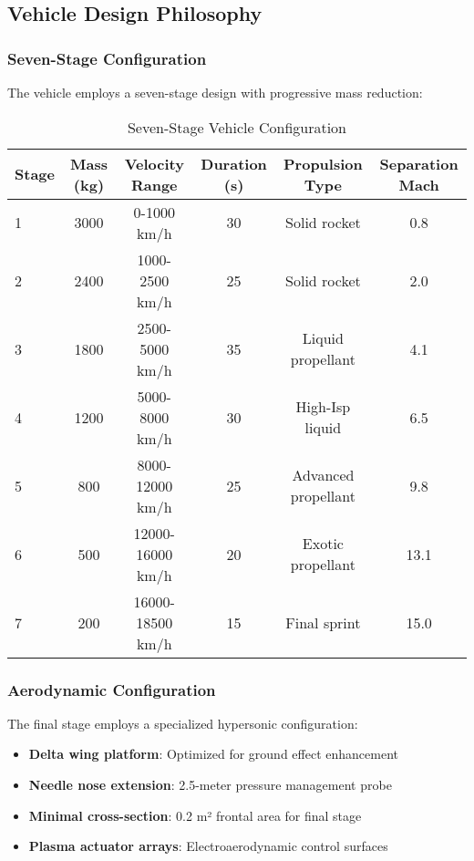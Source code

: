 \documentclass[12pt,a4paper]{article}
\begin{document}
\subsection{Vehicle Design Philosophy}

\subsubsection{Seven-Stage Configuration}
The vehicle employs a seven-stage design with progressive mass reduction:

\begin{table}[H]
\centering
\caption{Seven-Stage Vehicle Configuration}
\label{tab:vehicle_stages}
\begin{tabular}{lccccc}
\toprule
Stage & Mass (kg) & Velocity Range & Duration (s) & Propulsion Type & Separation Mach \\
\midrule
1 & 3000 & 0-1000 km/h & 30 & Solid rocket & 0.8 \\
2 & 2400 & 1000-2500 km/h & 25 & Solid rocket & 2.0 \\
3 & 1800 & 2500-5000 km/h & 35 & Liquid propellant & 4.1 \\
4 & 1200 & 5000-8000 km/h & 30 & High-Isp liquid & 6.5 \\
5 & 800 & 8000-12000 km/h & 25 & Advanced propellant & 9.8 \\
6 & 500 & 12000-16000 km/h & 20 & Exotic propellant & 13.1 \\
7 & 200 & 16000-18500 km/h & 15 & Final sprint & 15.0 \\
\bottomrule
\end{tabular}
\end{table}

\subsubsection{Aerodynamic Configuration}
The final stage employs a specialized hypersonic configuration:

\begin{itemize}
\item \textbf{Delta wing platform}: Optimized for ground effect enhancement
\item \textbf{Needle nose extension}: 2.5-meter pressure management probe
\item \textbf{Minimal cross-section}: 0.2 m² frontal area for final stage
\item \textbf{Plasma actuator arrays}: Electroaerodynamic control surfaces
\end{itemize}
\end{document}
